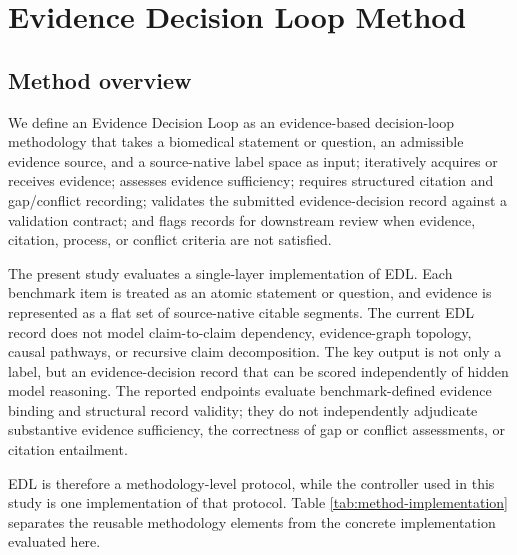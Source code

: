 \documentclass[11pt,a4paper]{article}
\begin{document}
\section{Evidence Decision Loop Method}

\subsection{Method overview}

We define an Evidence Decision Loop as an evidence-based decision-loop methodology that takes a biomedical statement or question, an admissible evidence source, and a source-native label space as input; iteratively acquires or receives evidence; assesses evidence sufficiency; requires structured citation and gap/conflict recording; validates the submitted evidence-decision record against a validation contract; and flags records for downstream review when evidence, citation, process, or conflict criteria are not satisfied.

The present study evaluates a single-layer implementation of EDL. Each benchmark item is treated as an atomic statement or question, and evidence is represented as a flat set of source-native citable segments. The current EDL record does not model claim-to-claim dependency, evidence-graph topology, causal pathways, or recursive claim decomposition. The key output is not only a label, but an evidence-decision record that can be scored independently of hidden model reasoning. The reported endpoints evaluate benchmark-defined evidence binding and structural record validity; they do not independently adjudicate substantive evidence sufficiency, the correctness of gap or conflict assessments, or citation entailment.

EDL is therefore a methodology-level protocol, while the controller used in this study is one implementation of that protocol. Table \ref{tab:method-implementation} separates the reusable methodology elements from the concrete implementation evaluated here.
\end{document}
